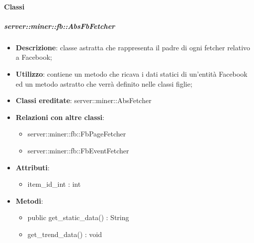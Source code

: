 	\paragraph{Classi} %
		\subparagraph{server::miner::fb::AbsFbFetcher} %
		\label{subp:server_miner_fb_AbsFbFetcher}
			\begin{itemize}
				\item \textbf{Descrizione}: classe astratta che rappresenta il padre di ogni fetcher relativo a Facebook;
				\item \textbf{Utilizzo}: contiene un metodo che ricava i dati statici di un'entità Facebook ed un metodo astratto che verrà definito nelle classi figlie;
				\item \textbf{Classi ereditate}: server::miner::AbsFetcher
				\item \textbf{Relazioni con altre classi}:
					\begin{itemize}
						\item server::miner::fb::FbPageFetcher
						\item server::miner::fb::FbEventFetcher
					\end{itemize}
				\item \textbf{Attributi}: 
					\begin{itemize}
						\item item\_id\_int : int
					\end{itemize}
				\item \textbf{Metodi}:   
					\begin{itemize}
						\item public get\_static\_data() : String
						\item get\_trend\_data() : void
					\end{itemize}
			\end{itemize}

